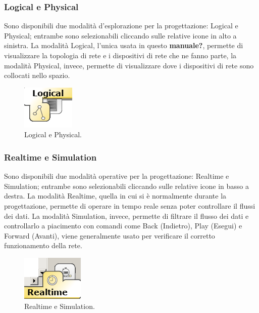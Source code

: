 \subsubsection{Logical e Physical}
Sono disponibili due modalità d'esplorazione per la progettazione: Logical e Physical; entrambe sono selezionabili cliccando sulle relative icone in alto a sinistra. La modalità Logical, l'unica usata in questo \textbf{manuale?}, permette di visualizzare la topologia di rete e i dispositivi di rete che ne fanno parte, la modalità Physical, invece, permette di visualizzare dove i dispositivi di rete sono collocati nello spazio.

\begin{figure}[htbp]
    \centerline{\includegraphics[scale=.6]{images/02.packet-tracer/logical_physical.png}}
    \caption{Logical e Physical.}
\end{figure}

\subsubsection{Realtime e Simulation}
Sono disponibili due modalità operative per la progettazione: Realtime e Simulation; entrambe sono selezionabili cliccando sulle relative icone in basso a destra. La modalità Realtime, quella in cui si è normalmente durante la progettazione, permette di operare in tempo reale senza poter controllare il flussi dei dati. La modalità Simulation, invece, permette di filtrare il flusso dei dati e controllarlo a piacimento con comandi come Back (Indietro), Play (Esegui) e Forward (Avanti), viene generalmente usato per verificare il corretto funzionamento della rete. 

\begin{figure}[htbp]
    \centerline{\includegraphics[scale=.5]{images/02.packet-tracer/realtime_simulation.png}}
    \caption{Realtime e Simulation.}
\end{figure}

